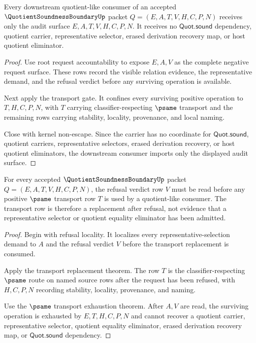 \begin{theorem}
\label{thm:quotient-soundness-boundary-downstream-nonimport}
Every downstream quotient-like consumer of an accepted $\QuotientSoundnessBoundaryUp$ packet $Q=(E,A,T,V,H,C,P,N)$ receives only the audit surface $E,A,T,V,H,C,P,N$. It receives no $\mathsf{Quot.sound}$ dependency, quotient carrier, representative selector, erased derivation recovery map, or host quotient eliminator.
\end{theorem}
\begin{proof}
Use root request accountability to expose $E,A,V$ as the complete negative request surface. These rows record the visible relation evidence, the representative demand, and the refusal verdict before any surviving operation is available.

Next apply the transport gate. It confines every surviving positive operation to $T,H,C,P,N$, with $T$ carrying classifier-respecting $\psame$ transport and the remaining rows carrying stability, locality, provenance, and local naming.

Close with kernel non-escape. Since the carrier has no coordinate for $\mathsf{Quot.sound}$, quotient carriers, representative selectors, erased derivation recovery, or host quotient eliminators, the downstream consumer imports only the displayed audit surface.
\end{proof}

\begin{theorem}
\label{thm:quotient-soundness-boundary-root-transport-verdict-order}
For every accepted $\QuotientSoundnessBoundaryUp$ packet $Q=(E,A,T,V,H,C,P,N)$, the refusal verdict row $V$ must be read before any positive $\psame$ transport row $T$ is used by a quotient-like consumer. The transport row is therefore a replacement after refusal, not evidence that a representative selector or quotient equality eliminator has been admitted.
\end{theorem}
\begin{proof}
Begin with refusal locality. It localizes every representative-selection demand to $A$ and the refusal verdict $V$ before the transport replacement is consumed.

Apply the transport replacement theorem. The row $T$ is the classifier-respecting $\psame$ route on named source rows after the request has been refused, with $H,C,P,N$ recording stability, locality, provenance, and naming.

Use the $\psame$ transport exhaustion theorem. After $A,V$ are read, the surviving operation is exhausted by $E,T,H,C,P,N$ and cannot recover a quotient carrier, representative selector, quotient equality eliminator, erased derivation recovery map, or $\mathsf{Quot.sound}$ dependency.
\end{proof}

